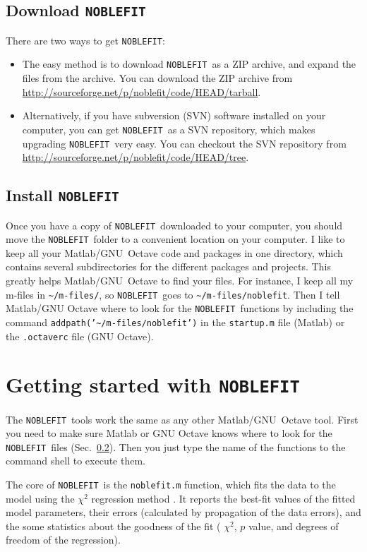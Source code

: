 \documentclass[12pt]{article}
\newcommand{\noblefit}{{\tt NOBLEFIT}}
\newcommand{\secref}[1]{Sec.~\ref{sec:#1}}
\begin{document}
\subsection{Download \noblefit}\label{sec:get_mpic}
There are two ways to get \noblefit: 
\begin{itemize}
	\item The easy method is to download \noblefit\ as a ZIP archive, and expand the files from the archive. You can download the ZIP archive from \url{http://sourceforge.net/p/noblefit/code/HEAD/tarball}.
	\item Alternatively, if you have subversion (SVN) software installed on your computer, you can get \noblefit\ as a SVN repository, which makes upgrading \noblefit\ very easy. You can checkout the SVN repository from \url{http://sourceforge.net/p/noblefit/code/HEAD/tree}.
\end{itemize}

\subsection{Install \noblefit}\label{sec:install_mpic}
Once you have a copy of \noblefit\ downloaded to your computer, you should move the \noblefit\ folder to a convenient location on your computer. I like to keep all your Matlab/\mbox{GNU Octave} code and packages in one directory, which contains several subdirectories for the different packages and projects. This greatly helps Matlab/\mbox{GNU Octave} to find your files. For instance, I keep all my m-files in {\tt \textasciitilde{}/m-files/}, so \noblefit\ goes to {\tt \textasciitilde{}/m-files/noblefit}. Then I tell Matlab/GNU Octave where to look for the \noblefit\ functions by including the command {\tt addpath('\textasciitilde{}/m-files/noblefit')} in the {\tt startup.m} file (Matlab) or the {\tt .octaverc} file (GNU Octave).

\section{Getting started with \noblefit}
The \noblefit\ tools work the same as any other Matlab/\mbox{GNU Octave} tool. First you need to make sure Matlab or GNU Octave knows where to look for the \noblefit\ files (\secref{install_mpic}). Then you just type the name of the functions to the command shell to execute them.\par

The core of \noblefit\ is the {\tt noblefit.m} function, which fits the data to the model using the $\chi^2$ regression method \citep{Press:1986}. It reports the best-fit values of the fitted model parameters, their errors (calculated by propagation of the data errors), and the some statistics about the goodness of the fit ( $\chi^2$, $p$ value, and degrees of freedom of the regression).\par
\end{document}
